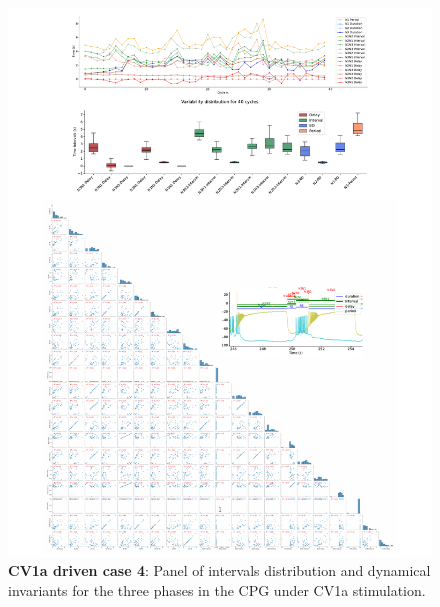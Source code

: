 \begin{figure}[htbp]
	\centering
	\includegraphics[width=1.1\textwidth]{./invariants/data/SUSSEX/CV1a_driven4/images/3phases/panel_with_pairplot.pdf}
	\caption{\textbf{CV1a driven case 4}: Panel of intervals distribution and dynamical invariants for the three phases in the CPG under CV1a stimulation.}
	\label{fig:cv1a 4 3phases pairplot}
\end{figure}

